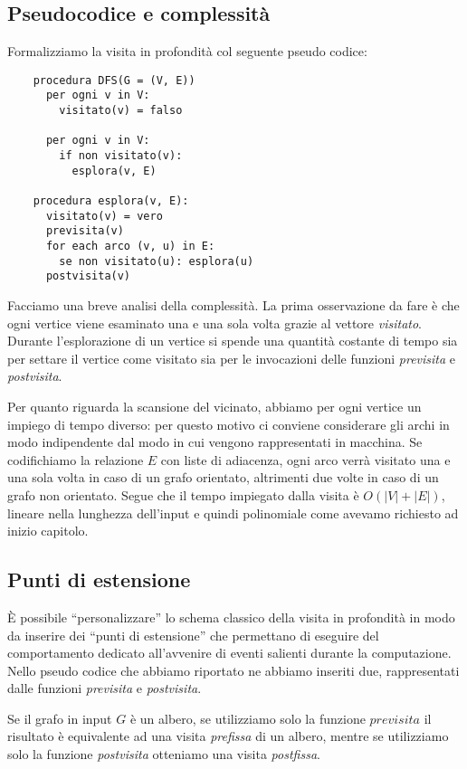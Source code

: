 \subsection{Pseudocodice e complessit\`a}
Formalizziamo la visita in profondit\`a col seguente pseudo codice:
\begin{lstlisting}
    procedura DFS(G = (V, E))
      per ogni v in V:
        visitato(v) = falso

      per ogni v in V:
        if non visitato(v):
          esplora(v, E)

    procedura esplora(v, E):
      visitato(v) = vero
      previsita(v)
      for each arco (v, u) in E:
        se non visitato(u): esplora(u)
      postvisita(v)
\end{lstlisting}
Facciamo una breve analisi della complessit\`a. La prima osservazione
da fare \`e che ogni vertice viene esaminato una e una sola volta
grazie al vettore \emph{visitato}. Durante l'esplorazione di un
vertice si spende una quantit\`a costante di tempo sia per settare il
vertice come visitato sia per le invocazioni delle funzioni
\emph{previsita} e \emph{postvisita}. 

Per quanto riguarda la scansione del vicinato, abbiamo per ogni
vertice un impiego di tempo diverso: per questo motivo ci conviene
considerare gli archi in modo indipendente dal modo in cui vengono
rappresentati in macchina. Se codifichiamo la relazione $E$ con liste
di adiacenza, ogni arco verr\`a visitato una e una sola volta in caso
di un grafo orientato, altrimenti due volte in caso di un grafo non
orientato. Segue che il tempo impiegato dalla visita \`e $O(|V| +
|E|)$, lineare nella lunghezza dell'input e quindi polinomiale come
avevamo richiesto ad inizio capitolo.

\subsection{Punti di estensione}
\`E possibile ``personalizzare'' lo schema classico della visita in
profondit\`a in modo da inserire dei ``punti di estensione'' che
permettano di eseguire del comportamento dedicato all'avvenire di
eventi salienti durante la computazione. Nello pseudo codice che
abbiamo riportato ne abbiamo inseriti due, rappresentati dalle
funzioni \emph{previsita} e \emph{postvisita}.

Se il grafo in input $G$ \`e un albero, se utilizziamo solo la
funzione $previsita$ il risultato \`e equivalente ad una visita
\emph{prefissa} di un albero, mentre se utilizziamo solo la funzione
\emph{postvisita} otteniamo una visita \emph{postfissa}.

